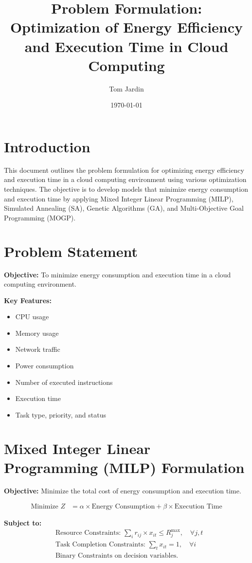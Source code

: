 \documentclass{article}
\title{Problem Formulation: Optimization of Energy Efficiency and Execution Time in Cloud Computing}
\author{Tom Jardin}
\date{\today}
\begin{document}
\maketitle

\section*{Introduction}
This document outlines the problem formulation for optimizing energy efficiency and execution time in a cloud computing environment using various optimization techniques. The objective is to develop models that minimize energy consumption and execution time by applying Mixed Integer Linear Programming (MILP), Simulated Annealing (SA), Genetic Algorithms (GA), and Multi-Objective Goal Programming (MOGP).

\section*{Problem Statement}
\textbf{Objective:} To minimize energy consumption and execution time in a cloud computing environment.

\textbf{Key Features:}
\begin{itemize}
    \item CPU usage
    \item Memory usage
    \item Network traffic
    \item Power consumption
    \item Number of executed instructions
    \item Execution time
    \item Task type, priority, and status
\end{itemize}

\section*{Mixed Integer Linear Programming (MILP) Formulation}
\textbf{Objective:} Minimize the total cost of energy consumption and execution time.

\begin{align*}
    \text{Minimize } Z &= \alpha \times \text{Energy Consumption} + \beta \times \text{Execution Time}
\end{align*}

\textbf{Subject to:}
\begin{align*}
    &\text{Resource Constraints: } \sum_{i} r_{ij} \times x_{it} \leq R_{j}^{\text{max}}, \quad \forall j, t \\
    &\text{Task Completion Constraints: } \sum_{t} x_{it} = 1, \quad \forall i \\
    &\text{Binary Constraints on decision variables.}
\end{align*}
\end{document}

